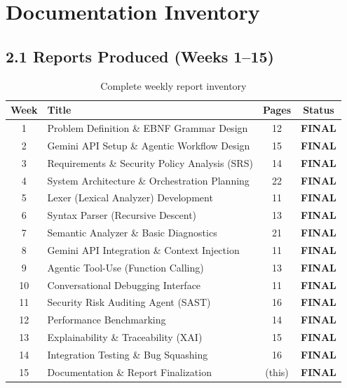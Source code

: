 \documentclass[a4paper,11pt]{article}
\newcommand{\statusgood}[1]{\colorbox{green!20}{\textbf{#1}}}
\begin{document}
\section{Documentation Inventory}

\subsection{2.1 Reports Produced (Weeks 1--15)}

\begin{table}[h]
\centering
\begin{tabularx}{\textwidth}{|c|l|c|c|}
\hline
\rowcolor{cyan!10}
\textbf{Week} & \textbf{Title} & \textbf{Pages} & \textbf{Status} \\
\hline
1 & Problem Definition \& EBNF Grammar Design & 12 & \statusgood{FINAL} \\
2 & Gemini API Setup \& Agentic Workflow Design & 15 & \statusgood{FINAL} \\
3 & Requirements \& Security Policy Analysis (SRS) & 14 & \statusgood{FINAL} \\
4 & System Architecture \& Orchestration Planning & 22 & \statusgood{FINAL} \\
5 & Lexer (Lexical Analyzer) Development & 11 & \statusgood{FINAL} \\
6 & Syntax Parser (Recursive Descent) & 13 & \statusgood{FINAL} \\
7 & Semantic Analyzer \& Basic Diagnostics & 21 & \statusgood{FINAL} \\
8 & Gemini API Integration \& Context Injection & 11 & \statusgood{FINAL} \\
9 & Agentic Tool-Use (Function Calling) & 13 & \statusgood{FINAL} \\
10 & Conversational Debugging Interface & 11 & \statusgood{FINAL} \\
11 & Security Risk Auditing Agent (SAST) & 16 & \statusgood{FINAL} \\
12 & Performance Benchmarking & 14 & \statusgood{FINAL} \\
13 & Explainability \& Traceability (XAI) & 15 & \statusgood{FINAL} \\
14 & Integration Testing \& Bug Squashing & 16 & \statusgood{FINAL} \\
15 & Documentation \& Report Finalization & (this) & \statusgood{FINAL} \\
\hline
\end{tabularx}
\caption{Complete weekly report inventory}
\end{table}
\end{document}
